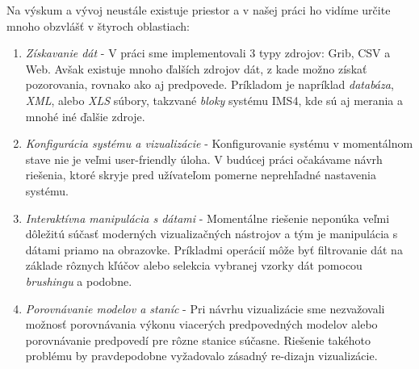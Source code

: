 Na výskum a vývoj neustále existuje priestor a v našej práci ho vidíme určite mnoho obzvlášť v štyroch oblastiach:
\begin{enumerate}
	\item \textit{Získavanie dát} - V práci sme implementovali 3 typy zdrojov: Grib, CSV a Web. Avšak existuje mnoho ďalších zdrojov dát, z kade možno získať pozorovania, rovnako ako aj predpovede. Príkladom je napríklad \textit{databáza}, \textit{XML}, alebo \textit{XLS} súbory, takzvané \textit{bloky} systému IMS4, kde sú aj merania a mnohé iné ďalšie zdroje. 
	\item \textit{Konfigurácia systému a vizualizácie} - Konfigurovanie systému v momentálnom stave nie je veľmi user-friendly úloha. V budúcej práci očakávame návrh riešenia, ktoré skryje pred užívateľom pomerne neprehľadné nastavenia systému.
	\item \textit{Interaktívna manipulácia s dátami} - Momentálne riešenie neponúka veľmi dôležitú súčasť moderných vizualizačných nástrojov a tým je manipulácia s dátami priamo na obrazovke. Príkladmi operácií môže byť filtrovanie dát na základe rôznych kľúčov alebo selekcia vybranej vzorky dát pomocou \textit{brushingu} a podobne.
	\item \textit{Porovnávanie modelov a staníc} - Pri návrhu vizualizácie sme nezvažovali možnosť porovnávania výkonu viacerých predpovedných modelov alebo porovnávanie predpovedí pre rôzne stanice súčasne. Riešenie takéhoto problému by pravdepodobne vyžadovalo zásadný re-dizajn vizualizácie.
	\end{enumerate} 	